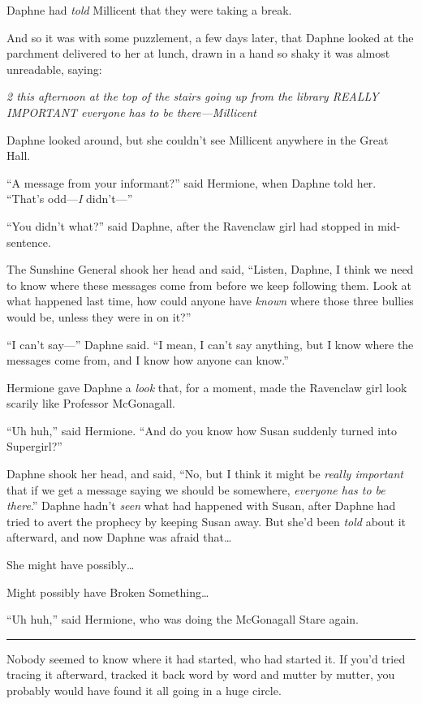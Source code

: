 Daphne had \emph{told} Millicent that they were taking a break.

And so it was with some puzzlement, a few days later, that Daphne looked
at the parchment delivered to her at lunch, drawn in a hand so shaky it
was almost unreadable, saying:

\emph{2 this afternoon at the top of the stairs going up from the
library REALLY IMPORTANT everyone has to be there---Millicent}

Daphne looked around, but she couldn't see Millicent anywhere in the
Great Hall.

``A message from your informant?'' said Hermione, when Daphne told her.
``That's odd---\emph{I} didn't---''

``You didn't what?'' said Daphne, after the Ravenclaw girl had stopped
in mid-sentence.

The Sunshine General shook her head and said, ``Listen, Daphne, I think
we need to know where these messages come from before we keep following
them. Look at what happened last time, how could anyone have
\emph{known} where those three bullies would be, unless they were in on
it?''

``I can't say---'' Daphne said. ``I mean, I can't say anything, but I
know where the messages come from, and I know how anyone can know.''

Hermione gave Daphne a \emph{look} that, for a moment, made the
Ravenclaw girl look scarily like Professor McGonagall.

``Uh huh,'' said Hermione. ``And do you know how Susan suddenly turned
into Supergirl?''

Daphne shook her head, and said, ``No, but I think it might be
\emph{really important} that if we get a message saying we should be
somewhere, \emph{everyone has to be there}.'' Daphne hadn't \emph{seen}
what had happened with Susan, after Daphne had tried to avert the
prophecy by keeping Susan away. But she'd been \emph{told} about it
afterward, and now Daphne was afraid that\ldots{}

She might have possibly\ldots{}

Might possibly have Broken Something\ldots{}

``Uh huh,'' said Hermione, who was doing the McGonagall Stare again.

\begin{center}\rule{3in}{0.4pt}\end{center}

Nobody seemed to know where it had started, who had started it. If you'd
tried tracing it afterward, tracked it back word by word and mutter by
mutter, you probably would have found it all going in a huge circle.

